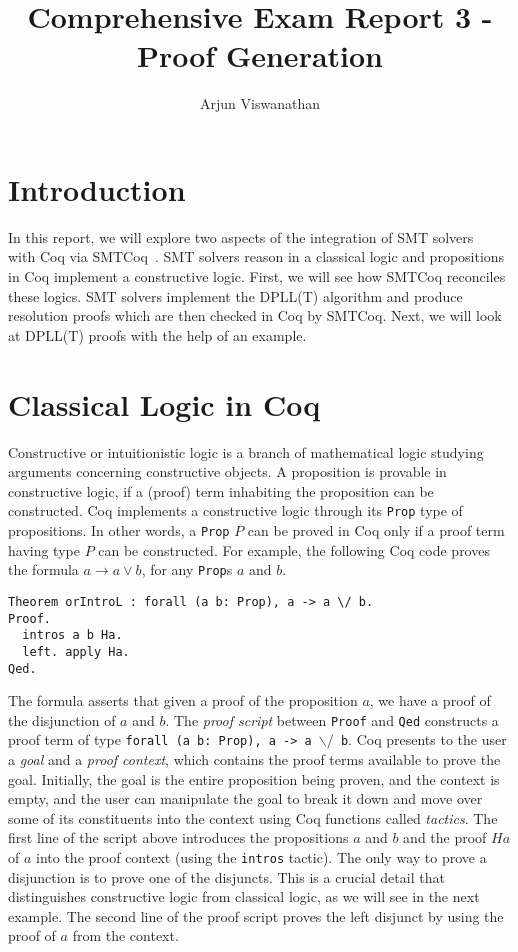 \documentclass{article}
\begin{document}
\title{Comprehensive Exam Report 3 - Proof Generation}
\author{Arjun Viswanathan}
\date{}
\maketitle

\section{Introduction}
\label{sec:intro}
	In this report, we will explore
	two aspects of the integration of 
	SMT solvers~\cite{Barrett2018} with 
	Coq via 
	SMTCoq~\cite{DBLP:phd/hal/Keller13}. 
	SMT solvers reason in 
	a classical logic and propositions 
	in Coq implement a constructive 
	logic. First, we will see how SMTCoq 
	reconciles these logics. SMT 
	solvers implement the DPLL(T) 
	algorithm and produce resolution 
	proofs which are then checked in 
	Coq by SMTCoq. Next, we will look at 
	DPLL(T) proofs with the help 
	of an example. 
	
\section{Classical Logic in Coq}
\label{sec:logic}
	Constructive or intuitionistic logic 
	is a branch of mathematical logic 
	studying arguments concerning 
	constructive objects. A proposition 
	is provable in constructive logic, if 
	a (proof) term inhabiting the 
	proposition can be constructed. 
	Coq implements a constructive 
	logic through its \texttt{Prop}
	type of propositions. In other words,
	a \texttt{Prop} $P$ can be proved in 
	Coq only if a proof term having 
	type $P$ can be constructed.
	For example, the following Coq
	code proves the formula
	$a \to a \lor b$, for any 
	\texttt{Prop}s $a$ and $b$.
\begin{verbatim}
Theorem orIntroL : forall (a b: Prop), a -> a \/ b.
Proof.
  intros a b Ha.
  left. apply Ha.
Qed.
\end{verbatim}
	The formula asserts that given a 
	proof of the proposition $a$, we
	have a proof of the 
	disjunction of $a$ and $b$. The 
	\textit{proof script} between 
	\texttt{Proof} 
	and \texttt{Qed} constructs a 
	proof term of type \texttt{forall 
	(a b: Prop), a -> a $\backslash/$ b}. 
	Coq presents to the user a \textit{goal}
	and a \textit{proof 
	context}, which contains the proof terms
	available to prove the goal.
	Initially, the goal is the entire 
	proposition being proven, and the 
	context is empty, and the user
	can manipulate the goal to break 
	it down and move over some of its 
	constituents into the context
	using Coq functions called 
	\textit{tactics}. The first line of the 
	script above introduces 
	the propositions $a$ and $b$ and the 
	proof $Ha$ of $a$ into the 
	proof context (using the \texttt{intros}
	tactic). The only way to prove a 
	disjunction is to prove one 
	of the disjuncts. This is a crucial
	detail that distinguishes constructive
	logic from classical logic, as we 
	will see in the next example. 
	The second line of the proof script 
	proves the left disjunct by using 
	the proof of $a$ from the context.
	
\end{document}
